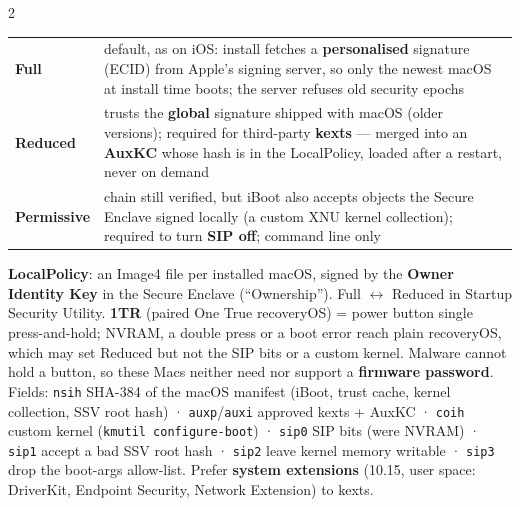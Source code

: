\documentclass[8pt]{extarticle}
\newcommand\ct[1]{\texttt{#1}}
\newcommand\hd[1]{\par\vspace{2pt}\noindent{\bfseries\color{sheetBlue}#1}\par\vspace{1pt}}
\begin{document}
\begin{multicols}{2}
\raggedright
\footnotesize{}

\hd{Secure Boot on Apple silicon}
\noindent{}
{\scriptsize\setlength\tabcolsep{2pt}
\begin{tabular}{@{}>{\raggedright\arraybackslash}p{11mm}>{\raggedright\arraybackslash}p{66mm}@{}}
\toprule
\textbf{Full} & default, as on iOS: install fetches a \textbf{personalised} signature (ECID) from Apple's signing server, so only the newest macOS at install time boots; the server refuses old security epochs \\
\textbf{Reduced} & trusts the \textbf{global} signature shipped with macOS (older versions); required for third-party \textbf{kexts} — merged into an \textbf{AuxKC} whose hash is in the LocalPolicy, loaded after a restart, never on demand \\
\textbf{Permissive} & chain still verified, but iBoot also accepts objects the Secure Enclave signed locally (a custom XNU kernel collection); required to turn \textbf{SIP off}; command line only \\
\bottomrule
\end{tabular}}\par
\textbf{LocalPolicy}: an Image4 file per installed macOS, signed by the \textbf{Owner Identity Key}
in the Secure Enclave (``Ownership''). Full $\leftrightarrow$ Reduced in Startup Security Utility.
\textbf{1TR} (paired One True recoveryOS) = power button single press-and-hold; NVRAM, a double
press or a boot error reach plain recoveryOS, which may set Reduced but not the SIP bits or a
custom kernel. Malware cannot hold a button, so these Macs neither need nor support a
\textbf{firmware password}. Fields: \ct{nsih} SHA-384 of the macOS manifest (iBoot, trust cache, kernel
collection, SSV root hash) · \ct{auxp}/\ct{auxi} approved kexts + AuxKC · \ct{coih} custom
kernel (\ct{kmutil configure-boot}) · \ct{sip0} SIP bits (were NVRAM) · \ct{sip1} accept a bad
SSV root hash · \ct{sip2} leave kernel memory writable · \ct{sip3} drop the boot-args allow-list.
Prefer \textbf{system extensions} (10.15, user space: DriverKit, Endpoint Security, Network
Extension) to kexts.


\end{multicols}
\end{document}
